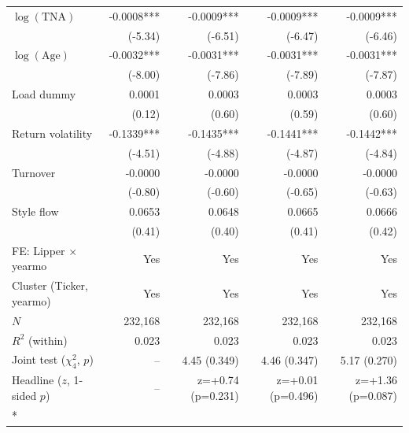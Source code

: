 \begin{ThreePartTable}
\begin{longtable}[t]{@{\extracolsep{\fill}}lrrrr}
$\log(\text{TNA})$ & -0.0008*** & -0.0009*** & -0.0009*** & -0.0009***\\
 & (-5.34) & (-6.51) & (-6.47) & (-6.46)\\
$\log(\text{Age})$ & -0.0032*** & -0.0031*** & -0.0031*** & -0.0031***\\
 & (-8.00) & (-7.86) & (-7.89) & (-7.87)\\
Load dummy & 0.0001 & 0.0003 & 0.0003 & 0.0003\\
 & (0.12) & (0.60) & (0.59) & (0.60)\\
Return volatility & -0.1339*** & -0.1435*** & -0.1441*** & -0.1442***\\
 & (-4.51) & (-4.88) & (-4.87) & (-4.84)\\
Turnover & -0.0000 & -0.0000 & -0.0000 & -0.0000\\
 & (-0.80) & (-0.60) & (-0.65) & (-0.63)\\
Style flow & 0.0653 & 0.0648 & 0.0665 & 0.0666\\
 & (0.41) & (0.40) & (0.41) & (0.42)\\
\midrule
FE: Lipper $\times$ yearmo & Yes & Yes & Yes & Yes\\
Cluster (Ticker, yearmo) & Yes & Yes & Yes & Yes\\
$N$ & 232,168 & 232,168 & 232,168 & 232,168\\
$R^2$ (within) & 0.023 & 0.023 & 0.023 & 0.023\\
Joint test ($\chi^2_4$, $p$) & -- & 4.45 (0.349) & 4.46 (0.347) & 5.17 (0.270)\\
Headline ($z$, 1-sided $p$) & -- & z=+0.74 (p=0.231) & z=+0.01 (p=0.496) & z=+1.36 (p=0.087)\\*
\end{longtable}
\end{ThreePartTable}
\endgroup{}

